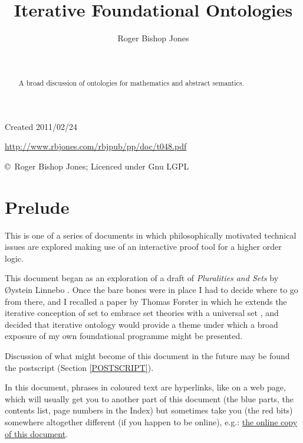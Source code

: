 \documentclass[11pt]{article}
\title{Iterative Foundational Ontologies}
\author{Roger Bishop Jones}
\date{\ }
\begin{document}
\begin{titlepage}
\maketitle
\begin{abstract}
A broad discussion of ontologies for mathematics and abstract semantics.
\end{abstract}
\vfill

\begin{centering}
{\footnotesize

Created 2011/02/24



\href{http://www.rbjones.com/rbjpub/pp/doc/t048.pdf}
{http://www.rbjones.com/rbjpub/pp/doc/t048.pdf}

\copyright\ Roger Bishop Jones; Licenced under Gnu LGPL

}%
\end{centering}

\thispagestyle{empty}
\end{titlepage}

\newpage
\addtocounter{page}{1}
{\parskip=0pt\tableofcontents}

\section{Prelude}

This is one of a series of documents in which philosophically motivated technical issues are explored making use of an interactive proof tool for a higher order logic.


This document began as an exploration of a draft of \emph{Pluralities and Sets} by {\O}ystein Linnebo \cite{linneboPS}.
Once the bare bones were in place I had to decide where to go from there, and I recalled a paper by Thomas Forster in which he extends the iterative conception of set to embrace set theories with a universal set \cite{forsterTICS}, and decided that iterative ontology would provide a theme under which a broad exposure of my own foundational programme might be presented.

Discussion of what might become of this document in the future may be found the postscript (Section \ref{POSTSCRIPT}).

In this document, phrases in coloured text are hyperlinks, like on a web page, which will usually get you to another part of this document (the blue parts, the contents list, page numbers in the Index) but sometimes take you (the red bits) somewhere altogether different (if you happen to be online), e.g.: \href{http://rbjones.com/rbjpub/pp/doc/t048.pdf}{the online copy of this document}.
\end{document}

